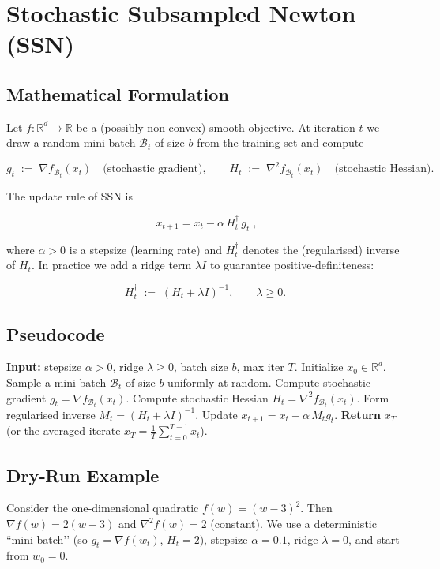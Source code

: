 \documentclass{article}
\newcommand{\R}{\mathbb{R}}
\begin{document}
\section*{Stochastic Subsampled Newton (SSN)}
\subsection*{Mathematical Formulation}
Let $f:\R^{d}\rightarrow\R$ be a (possibly non‑convex) smooth objective.  
At iteration $t$ we draw a random mini‑batch $\mathcal{B}_t$ of size $b$ from the training set and compute

\[
g_t \;:=\; \nabla f_{\mathcal{B}_t}(x_t)\quad\text{(stochastic gradient)},
\qquad 
H_t \;:=\; \nabla^{2} f_{\mathcal{B}_t}(x_t)\quad\text{(stochastic Hessian)}.
\]

The update rule of SSN is

\[
\boxed{\;x_{t+1}=x_t-\alpha\, H_t^{\dagger}\, g_t\;},
\tag{1}
\]

where $\alpha>0$ is a stepsize (learning rate) and $H_t^{\dagger}$ denotes the (regularised) inverse of $H_t$.  
In practice we add a ridge term $\lambda I$ to guarantee positive‑definiteness:

\[
H_t^{\dagger}\;:=\;(H_t+\lambda I)^{-1},\qquad \lambda\ge 0.
\]

\subsection*{Pseudocode}
\begin{algorithm}[H]
\caption{Stochastic Subsampled Newton (SSN)}
\begin{algorithmic}[1]
\STATE \textbf{Input:} stepsize $\alpha>0$, ridge $\lambda\ge0$, batch size $b$, max iter $T$.
\STATE Initialize $x_0\in\R^{d}$.
    \STATE Sample a mini‑batch $\mathcal{B}_t$ of size $b$ uniformly at random.
    \STATE Compute stochastic gradient $g_t=\nabla f_{\mathcal{B}_t}(x_t)$.
    \STATE Compute stochastic Hessian $H_t=\nabla^{2} f_{\mathcal{B}_t}(x_t)$.
    \STATE Form regularised inverse $M_t=(H_t+\lambda I)^{-1}$.
    \STATE Update $x_{t+1}=x_t-\alpha\,M_t g_t$.
\ENDFOR
\STATE \textbf{Return} $x_T$ (or the averaged iterate $\bar x_T=\frac1T\sum_{t=0}^{T-1}x_t$).
\end{algorithmic}
\end{algorithm}

\subsection*{Dry‑Run Example}
Consider the one‑dimensional quadratic $f(w)=(w-3)^2$.  
Then $\nabla f(w)=2(w-3)$ and $\nabla^{2}f(w)=2$ (constant).  
We use a deterministic “mini‑batch’’ (so $g_t=\nabla f(w_t)$, $H_t=2$), stepsize $\alpha=0.1$, ridge $\lambda=0$, and start from $w_0=0$.
\end{document}

